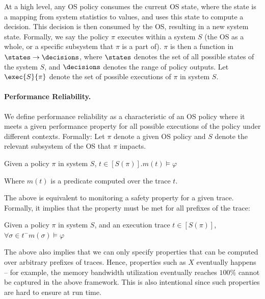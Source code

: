 At a high level, any OS policy consumes the current OS state, where the state is a mapping from system statistics to values, and uses this state to compute a decision. This decision is then consumed by the OS, resulting in a new system state.
Formally, we say the policy $\pi$ executes within a system $S$ (the OS as a whole, or a specific subsystem that $\pi$ is a part of).
$\pi$ is then a function in $\states\rightarrow\decisions$, where $\states$ denotes the set of all possible states of the system $S$, and $\decisions$ denotes the range of policy outputs.
Let $\exec{S}{\pi}$ denote the set of possible executions of $\pi$ in system $S$.


\paragraph{Performance Reliability.}
We define performance reliability as a characteristic of an OS policy where it meets a given performance property for all possible executions of the policy under different contexts. Formally:
Let $\pi$ denote a given OS policy and $S$ denote the relevant subsystem of the OS that $\pi$ impacts. 

Given a policy $\pi$ in system $S$, $t \in [S(\pi)] . m(t) \models \varphi$

Where $m(t)$ is a predicate computed over the trace $t$.


The above is equivalent to monitoring a safety property for a given trace. Formally, it implies that the property must be met for all prefixes of the trace:

Given a policy $\pi$ in system $S$, and an execution trace $t \in [S(\pi)]$, $\forall \sigma \in t^{-} m(\sigma) \models \varphi$

The above also implies that we can only specify properties that can be computed over arbitrary prefixes of traces. Hence, properties such as $X$ eventually happens -- for example, the memory bandwidth utilization eventually reaches $100\%$ cannot be captured in the above framework. This is also intentional since such properties are hard to ensure at run time.

